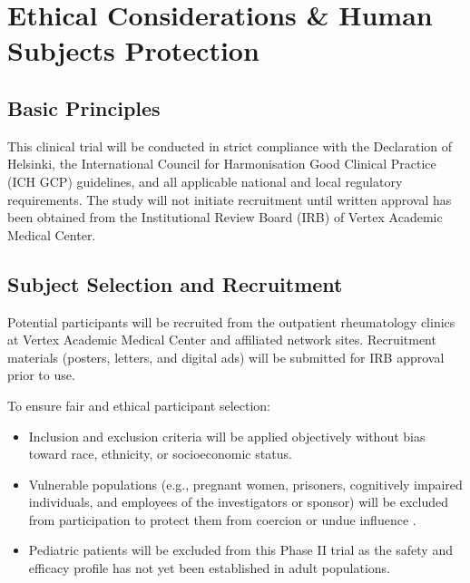 \section{Ethical Considerations \& Human Subjects Protection}

\subsection{Basic Principles}
This clinical trial will be conducted in strict compliance with the Declaration of Helsinki, the International Council for Harmonisation Good Clinical Practice (ICH GCP) guidelines, and all applicable national and local regulatory requirements. The study will not initiate recruitment until written approval has been obtained from the Institutional Review Board (IRB) of Vertex Academic Medical Center.

\subsection{Subject Selection and Recruitment}
Potential participants will be recruited from the outpatient rheumatology clinics at Vertex Academic Medical Center and affiliated network sites. Recruitment materials (posters, letters, and digital ads) will be submitted for IRB approval prior to use. 

To ensure fair and ethical participant selection:
\begin{itemize}
    \item Inclusion and exclusion criteria will be applied objectively without bias toward race, ethnicity, or socioeconomic status.
    \item Vulnerable populations (e.g., pregnant women, prisoners, cognitively impaired individuals, and employees of the investigators or sponsor) will be excluded from participation to protect them from coercion or undue influence \cite{nimbus2023standard}.
    \item Pediatric patients will be excluded from this Phase II trial as the safety and efficacy profile has not yet been established in adult populations.
\end{itemize}

